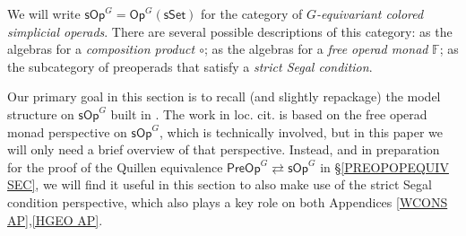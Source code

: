 \documentclass[a4paper,10pt
,draft
]{article}%
\numberwithin{equation}{section}
\numberwithin{figure}{section}
\theoremstyle{definition} %
\newcommand{\1}{\ensuremath{\mathbbm 1}}%
\begin{document}
We will write $\mathsf{sOp}^G = \mathsf{Op}^{G}(\mathsf{sSet})$
for the 
category of \textit{$G$-equivariant colored simplicial operads}.
There are several possible descriptions of this category:
as the algebras for a \emph{composition product $\circ$};
as the algebras for a \emph{free operad monad} $\mathbb{F}$;
as the subcategory of preoperads that satisfy a \emph{strict Segal condition}.

Our primary goal in this section is to recall (and slightly repackage) the model structure on $\mathsf{sOp}^G$ built in 
\cite{BP_HGOP}.
The work in loc. cit. is based on the free operad monad perspective on 
$\mathsf{sOp}^G$, which is technically involved,
but in this paper we will only need a brief overview of that perspective.
%
Instead, and in preparation for the proof of the Quillen equivalence
$\mathsf{PreOp}^G \rightleftarrows \mathsf{sOp}^G$
in \S \ref{PREOPOPEQUIV SEC},
we will find it useful in this section to also make use of the 
strict Segal condition perspective,
which also plays a key role on both 
Appendices \ref{WCONS AP},\ref{HGEO AP}.
\end{document}

